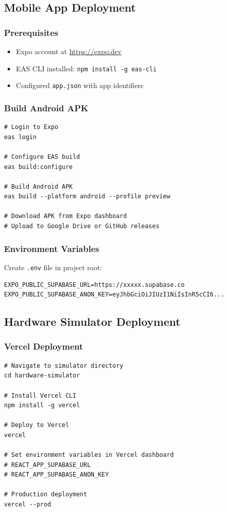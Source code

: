 \documentclass[12pt,a4paper]{article}
\begin{document}
\subsection{Mobile App Deployment}

\subsubsection{Prerequisites}
\begin{itemize}[leftmargin=*]
    \item Expo account at \url{https://expo.dev}
    \item EAS CLI installed: \texttt{npm install -g eas-cli}
    \item Configured \texttt{app.json} with app identifiers
\end{itemize}

\subsubsection{Build Android APK}
\begin{verbatim}
# Login to Expo
eas login

# Configure EAS build
eas build:configure

# Build Android APK
eas build --platform android --profile preview

# Download APK from Expo dashboard
# Upload to Google Drive or GitHub releases
\end{verbatim}

\subsubsection{Environment Variables}
Create \texttt{.env} file in project root:
\begin{verbatim}
EXPO_PUBLIC_SUPABASE_URL=https://xxxxx.supabase.co
EXPO_PUBLIC_SUPABASE_ANON_KEY=eyJhbGciOiJIUzI1NiIsInR5cCI6...
\end{verbatim}

\subsection{Hardware Simulator Deployment}

\subsubsection{Vercel Deployment}
\begin{verbatim}
# Navigate to simulator directory
cd hardware-simulator

# Install Vercel CLI
npm install -g vercel

# Deploy to Vercel
vercel

# Set environment variables in Vercel dashboard
# REACT_APP_SUPABASE_URL
# REACT_APP_SUPABASE_ANON_KEY

# Production deployment
vercel --prod
\end{verbatim}
\end{document}
